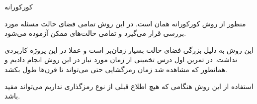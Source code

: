 \SubProblem
{کورکورانه}
{
منظور از روش کورکورانه همان
است.
در این روش تمامی فضای حالت مسئله مورد بررسی قرار می‌گیرد و تمامی حالت‌های ممکن آزموده می‌شود.

این روش به دلیل بزرگی فضای حالت بسیار زمان‌بر است و عملا در این پروژه کاربردی نداشت.
در تمرین اول درس تخمینی از زمان مورد نیاز در این روش انجام دادیم و همانطور که مشاهده شد زمان رمزگشایی حتی می‌تواند تا قرن‌ها طول بکشد.

استفاده از این روش هنگامی که هیچ اطلاع قبلی از نوع رمزگذاری نداریم می‌تواند مفید باشد.
}
